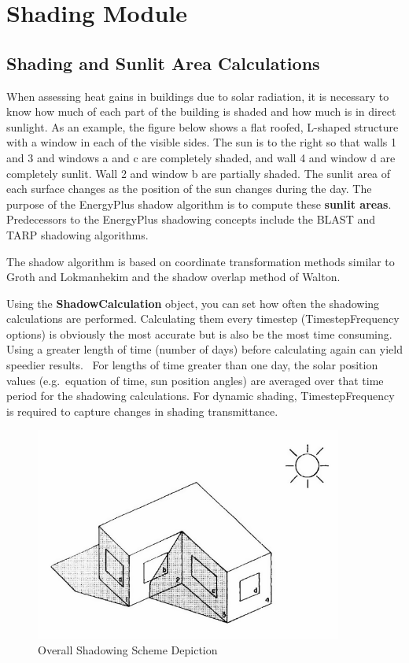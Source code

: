 \section{Shading Module}\label{shading-module}

\subsection{Shading and Sunlit Area Calculations}\label{shading-and-sunlit-area-calculations}

When assessing heat gains in buildings due to solar radiation, it is necessary to know how much of each part of the building is shaded and how much is in direct sunlight. As an example, the figure below shows a flat roofed, L-shaped structure with a window in each of the visible sides. The sun is to the right so that walls 1 and 3 and windows a and c are completely shaded, and wall 4 and window d are completely sunlit. Wall 2 and window b are partially shaded. The sunlit area of each surface changes as the position of the sun changes during the day. The purpose of the EnergyPlus shadow algorithm is to compute these \textbf{sunlit areas}.~ Predecessors to the EnergyPlus shadowing concepts include the BLAST and TARP shadowing algorithms.

The shadow algorithm is based on coordinate transformation methods similar to Groth and Lokmanhekim and the shadow overlap method of Walton.

Using the \textbf{ShadowCalculation} object, you can set how often the shadowing calculations are performed. Calculating them every timestep (TimestepFrequency options) is obviously the most accurate but is also be the most time consuming.~ Using a greater length of time (number of days) before calculating again can yield speedier results.~ For lengths of time greater than one day, the solar position values (e.g.~equation of time, sun position angles) are averaged over that time period for the shadowing calculations. For dynamic shading, TimestepFrequency is required to capture changes in shading transmittance.

\begin{figure}[hbtp] %
\centering
\includegraphics[width=0.9\textwidth, height=0.9\textheight, keepaspectratio=true]{media/image601.png}
\caption{Overall Shadowing Scheme Depiction \protect \label{fig:overall-shadowing-scheme-depiction}}
\end{figure}

